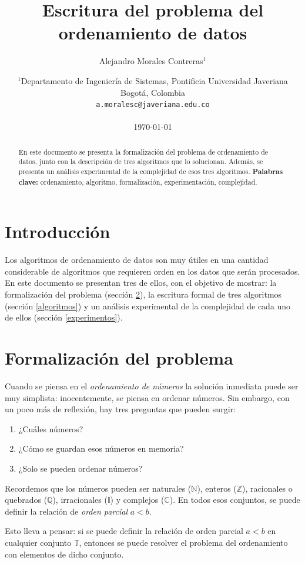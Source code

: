 \documentclass[letter]{article}
\title{Escritura del problema del ordenamiento de datos}
\author{Alejandro Morales Contreras$^1$}
\date{
	$^1$Departamento de Ingeniería de Sistemas, Pontificia Universidad Javeriana\\Bogotá,  Colombia \\
	\texttt{a.moralesc@javeriana.edu.co}\\~\\
	\today
}
\begin{document}
\maketitle
	
\begin{abstract}
En este documento se presenta la formalización del problema de ordenamiento de datos, junto con la descripción de tres algoritmos que lo solucionan. Además, se presenta un análisis experimental de la complejidad de esos tres algoritmos.
\textbf{Palabras clave:} ordenamiento, algoritmo, formalización, experimentación, complejidad.
\end{abstract}

\tableofcontents
	
\section{Introducción} \label{intro}
Los algoritmos de ordenamiento de datos son muy útiles en una cantidad considerable de algoritmos que requieren orden en los datos que serán procesados. En este documento se presentan tres de ellos, con el objetivo de mostrar: la formalización del problema (sección \ref{formalizacion}), la escritura formal de tres algoritmos (sección \ref{algoritmos}) y un análisis experimental de la complejidad de cada uno de ellos (sección \ref{experimentos}).

\section{Formalización del problema} \label{formalizacion}
Cuando se piensa en el {\it ordenamiento de números} la solución inmediata puede ser muy simplista: inocentemente, se piensa en ordenar números. Sin embargo, con un poco más de reflexión, hay tres preguntas que pueden surgir:
\begin{enumerate}
  \item ¿Cuáles números?
  \item ¿Cómo se guardan esos números en memoria?
  \item ¿Solo se pueden ordenar números?
\end{enumerate}

Recordemos que los números pueden ser naturales ($\mathbb{N}$), enteros ($\mathbb{Z}$), racionales o quebrados ($\mathbb{Q}$), irracionales ($\mathbb{I}$) y complejos ($\mathbb{C}$). En todos esos conjuntos, se puede definir la relación de {\it orden parcial} $a<b$.

Esto lleva a pensar: si se puede definir la relación de orden parcial $a<b$ en cualquier conjunto $\mathbb{T}$, entonces se puede resolver el problema del ordenamiento con elementos de dicho conjunto.
\end{document}
